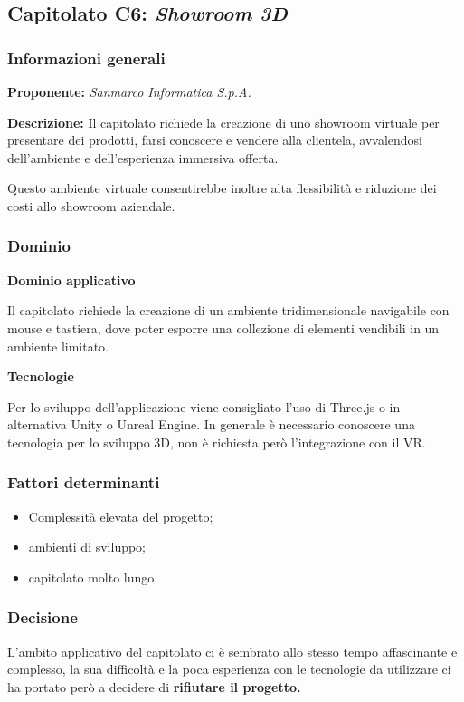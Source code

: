 \subsection{Capitolato C6: \textit{Showroom 3D}}

\subsubsection{Informazioni generali}

\textbf{Proponente:} \textit{Sanmarco Informatica S.p.A.}

\textbf{Descrizione:} Il capitolato richiede la creazione di uno showroom virtuale per presentare dei prodotti, farsi conoscere e vendere alla clientela, avvalendosi dell’ambiente e dell’esperienza immersiva offerta.

Questo ambiente virtuale consentirebbe inoltre alta flessibilità e riduzione dei costi allo showroom aziendale.

\subsubsection{Dominio}

\textbf{Dominio applicativo}

Il capitolato richiede la creazione di un ambiente tridimensionale navigabile con mouse e tastiera, dove poter esporre una collezione di elementi vendibili in un ambiente limitato.

\textbf{Tecnologie}

Per lo sviluppo dell'applicazione viene consigliato l'uso di Three.js o in alternativa Unity o Unreal Engine. In generale è necessario conoscere una tecnologia per lo sviluppo 3D, non è richiesta però l'integrazione con il VR.

\subsubsection{Fattori determinanti}
\begin{itemize}
    \item Complessità elevata del progetto;
    \item ambienti di sviluppo;
    \item capitolato molto lungo.
\end{itemize}

\subsubsection{Decisione}

L'ambito applicativo del capitolato ci è sembrato allo stesso tempo affascinante e complesso, la sua difficoltà e la poca esperienza con le tecnologie da utilizzare ci ha portato però a decidere di \textbf{rifiutare il progetto.}
